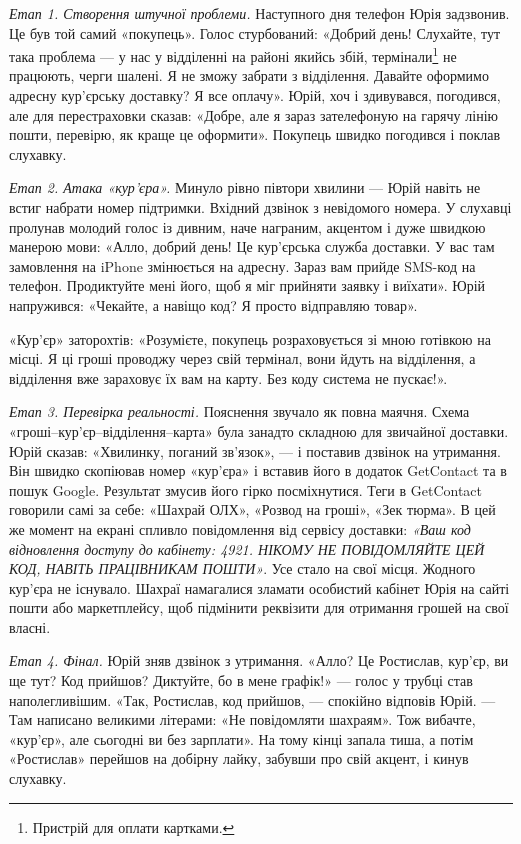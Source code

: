 \textit{Етап 1. Створення штучної проблеми.} 
Наступного дня телефон Юрія задзвонив. Це був той самий «покупець». Голос стурбований: «Добрий день! Слухайте, тут така проблема — у нас у відділенні на районі якийсь збій, термінали\footnote{Пристрій для оплати картками.} не працюють, черги шалені. Я не зможу забрати з відділення. Давайте оформимо адресну кур'єрську доставку? Я все оплачу». Юрій, хоч і здивувався, погодився, але для перестраховки сказав: «Добре, але я зараз зателефоную на гарячу лінію пошти, перевірю, як краще це оформити». Покупець швидко погодився і поклав слухавку.

\textit{Етап 2. Атака «кур'єра».} 
Минуло рівно півтори хвилини — Юрій навіть не встиг набрати номер підтримки. Вхідний дзвінок з невідомого номера. У слухавці пролунав молодий голос із дивним, наче награним, акцентом і дуже швидкою манерою мови: «Алло, добрий день! Це кур'єрська служба доставки. У вас там замовлення на iPhone змінюється на адресну. Зараз вам прийде SMS-код на телефон. Продиктуйте мені його, щоб я міг прийняти заявку і виїхати». Юрій напружився: «Чекайте, а навіщо код? Я просто відправляю товар». 

\newpage 

«Кур'єр» заторохтів: «Розумієте, покупець розраховується зі мною готівкою на місці. Я ці гроші проводжу через свій термінал, вони йдуть на відділення, а відділення вже зараховує їх вам на карту. Без коду система не пускає!».

\textit{Етап 3. Перевірка реальності.} Пояснення звучало як повна маячня. Схема «гроші–кур'єр–відділення–карта» була занадто складною для звичайної доставки. Юрій сказав: «Хвилинку, поганий зв'язок», — і поставив дзвінок на утримання. Він швидко скопіював номер «кур'єра» і вставив його в додаток GetContact та в пошук Google. Результат змусив його гірко посміхнутися. Теги в GetContact говорили самі за себе: «Шахрай ОЛХ», «Розвод на гроші», «Зек тюрма». В цей же момент на екрані спливло повідомлення від сервісу доставки: \textit{«Ваш код відновлення доступу до кабінету: 4921. НІКОМУ НЕ ПОВІДОМЛЯЙТЕ ЦЕЙ КОД, НАВІТЬ ПРАЦІВНИКАМ ПОШТИ»}. Усе стало на свої місця. Жодного кур'єра не існувало. Шахраї намагалися зламати особистий кабінет Юрія на сайті пошти або маркетплейсу, щоб підмінити реквізити для отримання грошей на свої власні.

\textit{Етап 4. Фінал.} Юрій зняв дзвінок з утримання. «Алло? Це Ростислав, кур'єр, ви ще тут? Код прийшов? Диктуйте, бо в мене графік!» — голос у трубці став наполегливішим. «Так, Ростислав, код прийшов, — спокійно відповів Юрій. — Там написано великими літерами: «Не повідомляти шахраям». Тож вибачте, «кур'єр», але сьогодні ви без зарплати». На тому кінці запала тиша, а потім «Ростислав» перейшов на добірну лайку, забувши про свій акцент, і кинув слухавку.

